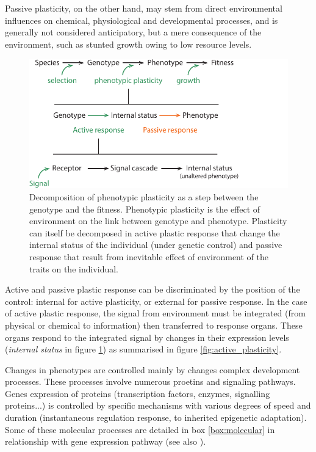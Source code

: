 Passive plasticity, on the other hand, may stem from direct environmental influences on chemical, physiological and developmental processes, and is generally not considered anticipatory, but a mere consequence of the environment, such as stunted growth owing to low resource levels.\\


\begin{figure}
    \includegraphics[width=1\linewidth]{./2_PP/Figures/Concepts/genotype_to_phenotype.pdf}
  \caption[Decomposition of plastic response]{Decomposition of phenotypic plasticity as a step between the genotype and the fitness. Phenotypic plasticity is the effect of environment on the link between genotype and phenotype. Plasticity can itself be decomposed in active plastic response that change the internal status of the individual (under genetic control) and passive response that result from inevitable effect of environment of the traits on the individual.}
  \label{fig:plasticity_form}
\end{figure}

Active and passive plastic response can be discriminated by the position of the control: internal for active plasticity, or external for passive response. In the case of active plastic response, the signal from environment must be integrated (from physical or chemical to information) then transferred to response organs. These organs respond to the integrated signal by changes in their expression levels (\textit{internal status} in figure \ref{fig:plasticity_form}) as summarised in figure \ref{fig:active_plasticity}.

Changes in phenotypes are controlled mainly by changes complex development processes. These processes involve numerous proetins and signaling pathways. Genes expression of proteins (transcription factors, enzymes, signalling proteins...) is controlled by specific mechanisms with various degrees of speed and duration (instantaneous regulation response, to inherited epigenetic adaptation). Some of these molecular processes are detailed in box \ref{box:molecular} in relationship with gene expression pathway (see also \cite{nicotra_plant_2010}).


